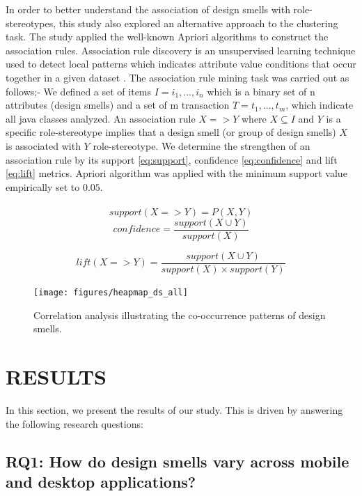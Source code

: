 \documentclass[AMA,Times1COL]{WileyNJDv5} %
\begin{document}
	In order to better understand the association of design smells with role-stereotypes, this study also explored an alternative approach to the clustering task. The study applied the well-known Apriori algorithms \cite{agrawal1996fast} to construct the association rules. Association rule discovery is an unsupervised learning technique used to detect local patterns which indicates attribute value conditions that occur together in a given dataset \cite{al2014improved}. The association rule mining task was carried out as follows;- We defined a set of items $I={i_1,...,i_n}$ which is a binary set of n attributes (design smells) and a set of m transaction $T={t_1,...,t_m}$, which indicate all java classes analyzed. An association rule $X => Y$ where $X \subseteq I$ and $Y$ is a specific role-stereotype implies that a design smell (or group of design smells) $X$ is associated with $Y$ role-stereotype.  We determine the strengthen of an association rule by its support \ref{eq:support}, confidence \ref{eq:confidence} and lift \ref{eq:lift} metrics. Apriori algorithm was applied with the minimum support value empirically set to $0.05$.
	\\~\\
	\begin{equation}
		support (X => Y) = P (X, Y)\label{eq:support}
	\end{equation}
	\begin{equation}
		confidence = 	\frac{support (X \cup Y)}{support (X)} \label{eq:confidence}
	\end{equation}
	
	\begin{equation}
		lift (X => Y) = \frac{support (X \cup Y)}{support (X) \times support (Y)} \label{eq:lift}
	\end{equation}
	
	\begin{figure}[!h]
	\centerline{\texttt{[image: figures/heapmap\_ds\_all]}}
	\caption{Correlation analysis illustrating the co-occurrence patterns of design smells.\label{fig:headmapdsall}}
	\end{figure}
	
	\section{RESULTS}\label{sec:result}
	
	In this section, we present the results of our study. This is driven by answering the following research questions:
	\subsection*{RQ1: How do design smells vary across mobile and desktop applications? }
	
\end{document}
